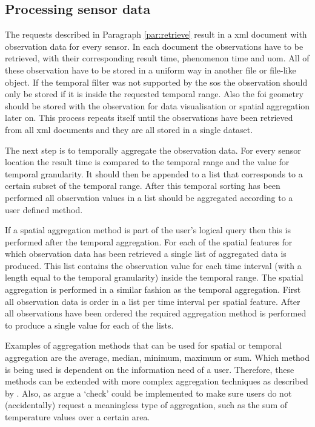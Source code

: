 \subsection{Processing sensor data}
The requests described in Paragraph \ref{par:retrieve} result in a \ac{xml} document with observation data for every sensor. In each document the observations have to be retrieved, with their corresponding result time, phenomenon time and \ac{uom}. All of these observation have to be stored in a uniform way in another file or file-like object. If the temporal filter was not supported by the \ac{sos} the observation should only be stored if it is inside the requested temporal range. Also the \ac{foi} geometry should be stored with the observation for data visualisation or spatial aggregation later on. This process repeats itself until the observations have been retrieved from all \ac{xml} documents and they are all stored in a single dataset.  

The next step is to temporally aggregate the observation data. For every sensor location the result time is compared to the temporal range and the value for temporal granularity. It should then be appended to a list that corresponds to a certain subset of the temporal range. After this temporal sorting has been performed all observation values in a list should be aggregated according to a user defined method. 

If a spatial aggregation method is part of the user's logical query then this is performed after the temporal aggregation. For each of the spatial features for which observation data has been retrieved a single list of aggregated data is produced. This list contains the observation value for each time interval (with a length equal to the temporal granularity) inside the temporal range. The spatial aggregation is performed in a similar fashion as the temporal aggregation. First all observation data is order in a list per time interval per spatial feature. After all observations have been ordered the required aggregation method is performed to produce a single value for each of the lists. 

Examples of aggregation methods that can be used for spatial or temporal aggregation are the average, median, minimum, maximum or sum. Which method is being used is dependent on the information need of a user. Therefore, these methods can be extended with more complex aggregation techniques as described by \citep{SW:Ganesan}. Also, as \cite{SSW:Stasch4} argue a `check' could be implemented to make sure users do not (accidentally) request a meaningless type of aggregation, such as the sum of temperature values over a certain area. 

